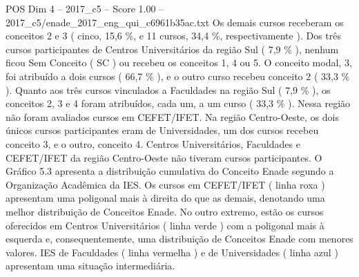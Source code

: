 \begin{textsample}{POS Dim 4 – 2017\_c5 – Score 1.00 – 2017\_c5/enade\_2017\_eng\_qui\_c6961b35ac.txt}
Os demais cursos receberam os conceitos 2 e 3 ( cinco, 15,6 \%, e 11 cursos, 34,4 \%, respectivamente ).
Dos três cursos participantes de Centros Universitários da região Sul ( 7,9 \% ), nenhum ficou Sem Conceito ( SC ) ou recebeu os conceitos 1, 4 ou 5.
O conceito modal, 3, foi atribuído a dois cursos ( 66,7 \% ), e o outro curso recebeu conceito 2 ( 33,3 \% ).
Quanto aos três cursos vinculados a Faculdades na região Sul ( 7,9 \% ), os conceitos 2, 3 e 4 foram atribuídos, cada um, a um curso ( 33,3 \% ).
Nessa região não foram avaliados cursos em CEFET/IFET.
Na região Centro-Oeste, os dois únicos cursos participantes eram de Universidades, um dos cursos recebeu conceito 3, e o outro, conceito 4.
Centros Universitários, Faculdades e CEFET/IFET da região Centro-Oeste não tiveram cursos participantes.
O Gráfico 5.3 apresenta a distribuição cumulativa do Conceito Enade segundo a Organização Acadêmica da IES.
Os cursos em CEFET/IFET ( linha roxa ) apresentam uma poligonal mais à direita do que as demais, denotando uma melhor distribuição de Conceitos Enade.
No outro extremo, estão os cursos oferecidos em Centros Universitários ( linha verde ) com a poligonal mais à esquerda e, consequentemente, uma distribuição de Conceitos Enade com menores valores.
IES de Faculdades ( linha vermelha ) e de Universidades ( linha azul ) apresentam uma situação intermediária.

\end{textsample}
